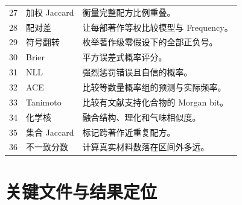\documentclass[UTF8,11pt,openany,fontset=none]{ctexbook}
\begin{document}
\begin{longtable}{cp{}p{}}
27 & 加权 Jaccard & 衡量完整配方比例重叠。\\
28 & 配对差 & 让每部著作等权比较模型与 Frequency。\\
29 & 符号翻转 & 枚举著作级零假设下的全部正负号。\\
30 & Brier & 平方误差式概率评分。\\
31 & NLL & 强烈惩罚错误且自信的概率。\\
32 & ACE & 比较等数量概率组的预测与实际频率。\\
33 & Tanimoto & 比较有文献支持化合物的 Morgan bit。\\
34 & 化学核 & 融合结构、理化和气味相似度。\\
35 & 集合 Jaccard & 标记跨著作近重复配方。\\
36 & 不一致分数 & 计算真实材料数落在区间外多远。\\
\bottomrule
\end{longtable}

\chapter{关键文件与结果定位}
\end{document}
